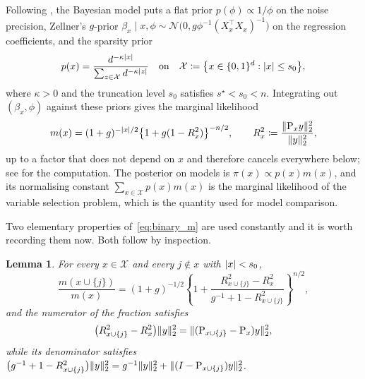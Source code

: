 \documentclass[aos]{imsart}%
\DeclarePairedDelimiter{\norm}{\lVert}{\rVert}
\DeclarePairedDelimiter{\abs}{\lvert}{\rvert}
\newcommand{\ambientspace}[0]{\mathcal{X}}
\newcommand{\calN}[0]{\mathcal{N}}
\theoremstyle{plain}
\newtheorem{lemma}[theorem]{Lemma}
\theoremstyle{definition}
\begin{document}
    Following \citet{YangWainwrightJordan2016}, the Bayesian model puts a flat
    prior $p(\phi)\propto1/\phi$ on the noise precision, Zellner's $g$-prior
    $\beta_x\mid x,\phi\sim\calN\bigl(0,g\phi^{-1}(X_x^{\top}X_x)^{-1}\bigr)$
    on the regression coefficients, and the sparsity prior
    \begin{equation}
        \label{eq:binary_prior}
        p(x)=\frac{d^{-\kappa\abs{x}}}
        {\sum_{z\in\ambientspace}d^{-\kappa\abs{z}}}
        \quad\text{on}\quad
        \ambientspace\coloneq\bigl\{x\in\{0,1\}^{d}:\abs{x}\leq s_0\bigr\},
    \end{equation}
    where $\kappa>0$ and the truncation level $s_0$ satisfies
    $s^\star<s_0<n$. Integrating out $(\beta_x,\phi)$ against these priors
    gives the marginal likelihood
    \begin{equation}
        \label{eq:binary_m}
        m(x)= (1+g)^{-\abs{x}/2}\bigl\{1+g(1-R_x^{2})\bigr\}^{-n/2},
        \qquad R^{2}_x\coloneq\frac{\norm{\Proj_x y}_2^{2}}{\norm{y}_2^{2}},
    \end{equation}
    up to a factor that does not depend on $x$ and therefore cancels
    everywhere below; see \citet[Appendix~A]{YangWainwrightJordan2016} for the
    computation. The posterior on models is
    $\pi(x)\propto p(x)m(x)$, and its normalising constant
    $\sum_{x\in\ambientspace}p(x)m(x)$ is the marginal likelihood of the
    variable selection problem, which is the quantity used for model
    comparison.

    Two elementary properties of~\eqref{eq:binary_m} are used constantly and it
    is worth recording them now. Both follow by inspection.

    \begin{lemma}
        \label{lemma:binary_ratio_formula}
        For every $x\in\ambientspace$ and every $j\notin x$ with
        $\abs{x}<s_0$,
        \begin{equation}
            \label{eq:binary_m_ratio}
            \frac{m(x\cup\{j\})}{m(x)}
            =(1+g)^{-1/2}
            \left\{1+\frac{R^{2}_{x\cup\{j\}}-R^{2}_x}
            {g^{-1}+1-R^{2}_{x\cup\{j\}}}\right\}^{n/2},
        \end{equation}
        and the numerator of the fraction satisfies
        \begin{equation}
            \label{eq:binary_gain}
            \bigl(R^{2}_{x\cup\{j\}}-R^{2}_x\bigr)\norm{y}_2^{2}
            =\norm{(\Proj_{x\cup\{j\}}-\Proj_x)y}_2^{2},
        \end{equation}
        while its denominator satisfies
        $\bigl(g^{-1}+1-R^{2}_{x\cup\{j\}}\bigr)\norm{y}_2^{2}
        =g^{-1}\norm{y}_2^{2}+\norm{(I-\Proj_{x\cup\{j\}})y}_2^{2}$.
    \end{lemma}
\end{document}

